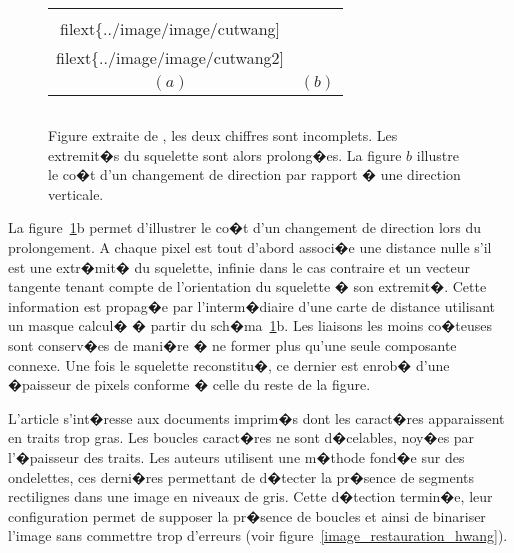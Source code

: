             \begin{figure}[ht]
        $$\begin{tabular}{|c|c|} \hline
        \texttt{[image: \\filext\{../image/image/cutwang]}} &
        \texttt{[image: \\filext\{../image/image/cutwang2]}} \\
        $(a)$ & $(b)$ 
        \\ \hline  \end{tabular}$$
        \caption{    Figure extraite de , les deux chiffres sont incomplets. Les extremit�s
                            du squelette sont alors prolong�es. La figure $b$ illustre le co�t d'un changement de direction par
                            rapport � une direction verticale.}
        \label{image_restauration_mbruitwang}
            \end{figure}

La figure~\ref{image_restauration_mbruitwang}b permet d'illustrer le co�t d'un changement de direction lors du prolongement. A chaque pixel est tout d'abord associ�e une distance nulle s'il est une extr�mit� du squelette, infinie dans le cas contraire et un vecteur tangente tenant compte de l'orientation du squelette � son extremit�. Cette information est propag�e par l'interm�diaire d'une carte de distance utilisant un masque calcul� � partir du sch�ma~\ref{image_restauration_mbruitwang}b. Les liaisons les moins co�teuses sont conserv�es de mani�re � ne former plus qu'une seule composante connexe. Une fois le squelette reconstitu�, ce dernier est enrob� d'une �paisseur de pixels conforme � celle du reste de la figure.


L'article  s'int�resse aux documents imprim�s dont les caract�res apparaissent en traits trop gras. Les boucles caract�res ne sont d�celables, noy�es par l'�paisseur des traits. Les auteurs utilisent une m�thode fond�e sur des ondelettes, ces derni�res permettant de d�tecter la pr�sence de segments rectilignes dans une image en niveaux de gris. Cette d�tection termin�e, leur configuration permet de supposer la pr�sence de boucles et ainsi de binariser l'image sans commettre trop d'erreurs (voir figure~\ref{image_restauration_hwang}).


